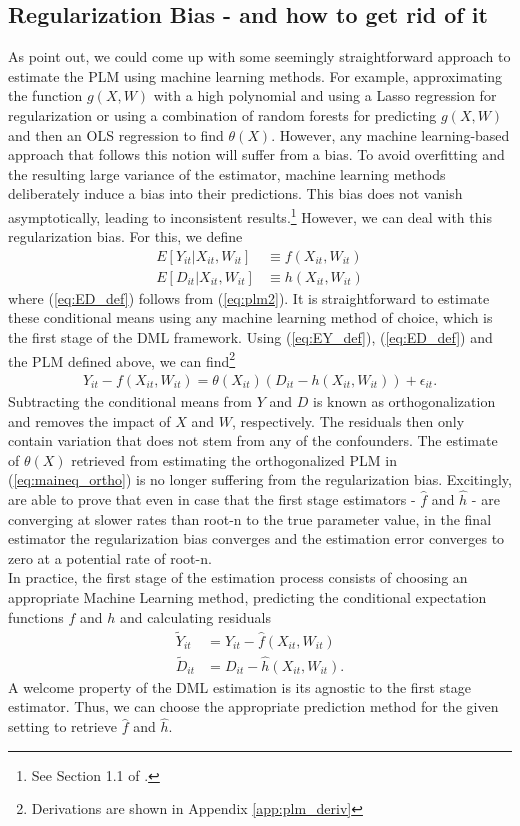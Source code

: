 \subsection{Regularization Bias - and how to get rid of it}
As \cite{DML2017} point out, we could come up with some seemingly straightforward approach to estimate the PLM using machine learning methods. For example, approximating the function $g(X, W)$ with a high polynomial and using a Lasso regression for regularization or using a combination of random forests for predicting $g(X, W)$ and then an OLS regression to find $\theta(X)$. However, any machine learning-based approach that follows this notion will suffer from a bias. To avoid overfitting and the resulting large variance of the estimator, machine learning methods deliberately induce a bias into their predictions. This bias does not vanish asymptotically, leading to inconsistent results.\footnote{See Section 1.1 of \cite{DML2017}.} However, we can deal with this regularization bias. For this, we define 
\begin{align}
    E[Y_{it}|X_{it}, W_{it}] &\equiv f(X_{it}, W_{it}) \label{eq:EY_def}\\ 
    E[D_{it}|X_{it}, W_{it}] &\equiv h(X_{it}, W_{it}) \label{eq:ED_def}
\end{align}
where (\ref{eq:ED_def}) follows from (\ref{eq:plm2}). It is straightforward to estimate these conditional means using any machine learning method of choice, which is the first stage of the DML framework. Using (\ref{eq:EY_def}), (\ref{eq:ED_def}) and the PLM defined above, we can find\footnote{Derivations are shown in Appendix \ref{app:plm_deriv}}
\begin{align}
    Y_{it}-f(X_{it}, W_{it})=\theta(X_{it})(D_{it}-h(X_{it}, W_{it})) + \epsilon_{it}. \label{eq:maineq_ortho}
\end{align}
Subtracting the conditional means from $Y$ and $D$ is known as orthogonalization and removes the impact of $X$ and $W$, respectively. The residuals then only contain variation that does not stem from any of the confounders. The estimate of $\theta(X)$ retrieved from  estimating the orthogonalized PLM in (\ref{eq:maineq_ortho}) is no longer suffering from the regularization bias. Excitingly, \cite{DML2017} are able to prove that even in case that the first stage estimators - $\hat{f}$ and $\hat{h}$ - are converging at slower rates than root-n to the true parameter value, in the final estimator the regularization bias converges and the estimation error converges to zero at a potential rate of root-n. \\
In practice, the first stage of the estimation process consists of choosing an appropriate Machine Learning method, predicting the conditional expectation functions $f$ and $h$ and calculating residuals 
\begin{align*} 
    \tilde{Y}_{it}&=Y_{it}-\hat{f}(X_{it}, W_{it}) \\ 
    \tilde{D}_{it}&=D_{it}-\hat{h}(X_{it}, W_{it}).
\end{align*}
A welcome property of the DML estimation is its agnostic to the first stage estimator. Thus, we can choose the appropriate prediction method for the given setting to retrieve $\hat{f}$ and $\hat{h}$.

